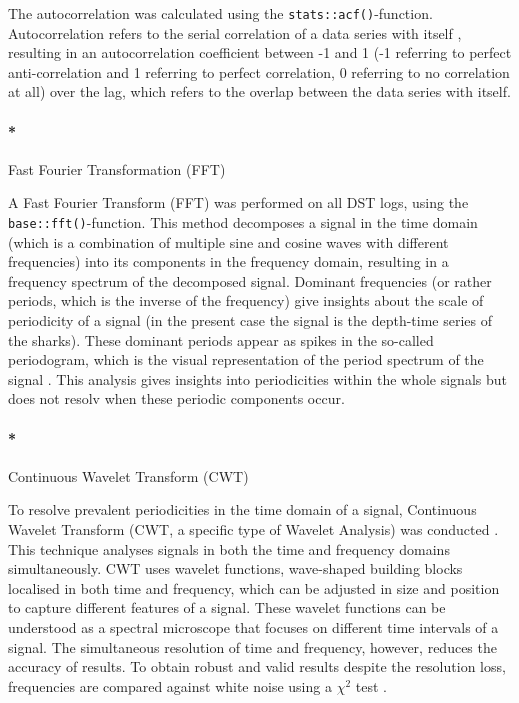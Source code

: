 \documentclass[
  authoryear,
  review,
  3p]{elsarticle}
\let\oldparagraph\paragraph
\renewcommand{\paragraph}[1]{\oldparagraph{#1}\mbox{}}
\begin{document}
The autocorrelation was calculated using the
\texttt{stats::acf()}-function. Autocorrelation refers to the serial
correlation of a data series with itself \citep{bartlett_1946},
resulting in an autocorrelation coefficient between -1 and 1 (-1
referring to perfect anti-correlation and 1 referring to perfect
correlation, 0 referring to no correlation at all) over the lag, which
refers to the overlap between the data series with itself.

\hypertarget{fast-fourier-transformation-fft}{%
\paragraph*{Fast Fourier Transformation
(FFT)}\label{fast-fourier-transformation-fft}}

A Fast Fourier Transform (FFT) was performed on all DST logs, using the
\texttt{base::fft()}-function. This method decomposes a signal in the
time domain (which is a combination of multiple sine and cosine waves
with different frequencies) into its components in the frequency domain,
resulting in a frequency spectrum of the decomposed signal. Dominant
frequencies (or rather periods, which is the inverse of the frequency)
give insights about the scale of periodicity of a signal (in the present
case the signal is the depth-time series of the sharks). These dominant
periods appear as spikes in the so-called periodogram, which is the
visual representation of the period spectrum of the signal
\citep{cochran_1967}. This analysis gives insights into periodicities
within the whole signals but does not resolv when these periodic
components occur.

\hypertarget{continuous-wavelet-transform-cwt}{%
\paragraph*{Continuous Wavelet Transform
(CWT)}\label{continuous-wavelet-transform-cwt}}

To resolve prevalent periodicities in the time domain of a signal,
Continuous Wavelet Transform (CWT, a specific type of Wavelet Analysis)
was conducted \citep{grinsted_2004}. This technique analyses signals in
both the time and frequency domains simultaneously. CWT uses wavelet
functions, wave-shaped building blocks localised in both time and
frequency, which can be adjusted in size and position to capture
different features of a signal. These wavelet functions can be
understood as a spectral microscope that focuses on different time
intervals of a signal. The simultaneous resolution of time and
frequency, however, reduces the accuracy of results. To obtain robust
and valid results despite the resolution loss, frequencies are compared
against white noise using a \(\chi^2\) test \citep{grinsted_2004}.
\end{document}
